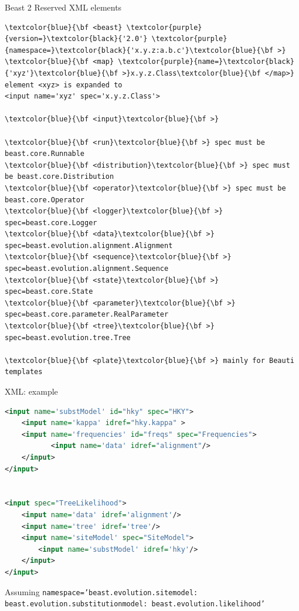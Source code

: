 \documentclass{beamer}
\theoremstyle{definition}
\begin{document}
\begin{frame}[containsverbatim]{Beast 2 Reserved XML elements}

{\small
\begin{Verbatim}[commandchars=\\\{\}]
\textcolor{blue}{\bf <beast} \textcolor{purple}{version=}\textcolor{black}{'2.0'} \textcolor{purple}{namespace=}\textcolor{black}{'x.y.z:a.b.c'}\textcolor{blue}{\bf >}
\textcolor{blue}{\bf <map} \textcolor{purple}{name=}\textcolor{black}{'xyz'}\textcolor{blue}{\bf >}x.y.z.Class\textcolor{blue}{\bf </map>}
element <xyz> is expanded to 
<input name='xyz' spec='x.y.z.Class'>

\textcolor{blue}{\bf <input}\textcolor{blue}{\bf >}

\textcolor{blue}{\bf <run}\textcolor{blue}{\bf >} spec must be beast.core.Runnable
\textcolor{blue}{\bf <distribution}\textcolor{blue}{\bf >} spec must be beast.core.Distribution
\textcolor{blue}{\bf <operator}\textcolor{blue}{\bf >} spec must be beast.core.Operator
\textcolor{blue}{\bf <logger}\textcolor{blue}{\bf >}    spec=beast.core.Logger
\textcolor{blue}{\bf <data}\textcolor{blue}{\bf >}      spec=beast.evolution.alignment.Alignment
\textcolor{blue}{\bf <sequence}\textcolor{blue}{\bf >}  spec=beast.evolution.alignment.Sequence
\textcolor{blue}{\bf <state}\textcolor{blue}{\bf >}     spec=beast.core.State
\textcolor{blue}{\bf <parameter}\textcolor{blue}{\bf >} spec=beast.core.parameter.RealParameter
\textcolor{blue}{\bf <tree}\textcolor{blue}{\bf >}      spec=beast.evolution.tree.Tree

\textcolor{blue}{\bf <plate}\textcolor{blue}{\bf >} mainly for Beauti templates
\end{Verbatim}
}
\end{frame}



\begin{frame}[containsverbatim]{XML: example}

{\small

\begin{lstlisting}[language=XML]
<input name='substModel' id="hky" spec="HKY">
    <input name='kappa' idref="hky.kappa" >
    <input name='frequencies' id="freqs" spec="Frequencies">
           <input name='data' idref="alignment"/>
    </input>
</input>


<input spec="TreeLikelihood">
    <input name='data' idref='alignment'/>
    <input name='tree' idref='tree'/>
    <input name='siteModel' spec="SiteModel">
        <input name='substModel' idref='hky'/>
    </input>
</input>
\end{lstlisting}


\color{blue}Assuming {\tt namespace='beast.evolution.sitemodel:
beast.evolution.substitutionmodel:\
beast.evolution.likelihood'}
}
\end{frame}
\end{document}
